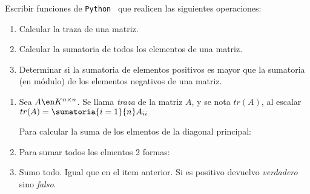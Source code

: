 \begin{enunciado}{\ejercicio}
  Escribir funciones de \texttt{Python \python} que realicen las siguientes operaciones:
  \begin{enumerate}[label=(\alph*)]
    \item Calcular la traza de una matriz.

    \item Calcular la sumatoria de todos los elementos de una matriz.

    \item Determinar si la sumatoria de elementos positivos es mayor que la sumatoria (en módulo)
          de los elementos negativos de una matriz.
  \end{enumerate}
\end{enunciado}

\begin{enumerate}[label=(\alph*)]
  \item Sea $A \en K^{n \times n}$. Se llama \textit{traza} de la matriz $A$, y se nota $tr(A)$, al
        escalar $tr(A) = \sumatoria{i=1}{n}A_{ii}$

        Para calcular la suma de los elmentos de la diagonal principal:
        \copyPaste

  \item Para sumar todos los elmentos 2 formas:

  \item Sumo todo. Igual que en el item anterior. Si es positivo devuelvo \textit{verdadero} sino \textit{falso}.
\end{enumerate}

\begin{aportes}
  \item {}
\end{aportes}
